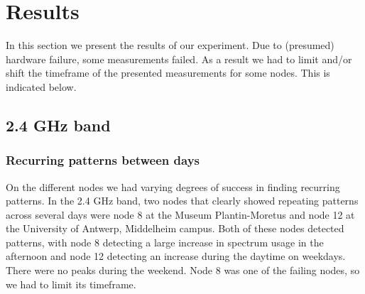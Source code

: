 \documentclass[a4paper, 11pt]{article}
\begin{document}
\section{Results}
In this section we present the results of our experiment. Due to (presumed) hardware failure, some measurements failed. As a result we had to limit and/or shift the timeframe of the presented measurements for some nodes. This is indicated below.
\subsection{2.4 GHz band}
\subsubsection{Recurring patterns between days}
On the different nodes we had varying degrees of success in finding recurring patterns. In the 2.4 GHz band, two nodes that clearly showed repeating patterns across several days were node 8 at the Museum Plantin-Moretus and node 12 at the University of Antwerp, Middelheim campus. Both of these nodes detected patterns, with node 8 detecting a large increase in spectrum usage in the afternoon and node 12 detecting an increase during the daytime on weekdays. There were no peaks during the weekend. Node 8 was one of the failing nodes, so we had to limit its timeframe.
\end{document}
